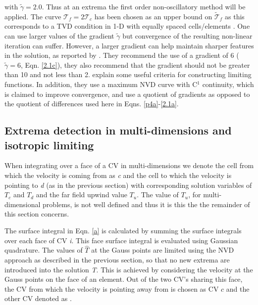 with $\widetilde{\gamma} = 2.0$. Thus at an extrema the first order non-oscillatory method will be applied.  The curve $\mathcal{T}_{f} = 2\mathcal{T}_{c}$ has been chosen as an upper bound on $\widetilde{\mathcal{T}}_{f}$ as this corresponds to a TVD condition in 1-D  with equally spaced cells/elements \citep[see][]{hirsch_1990}.  One can use larger values of the gradient $\widetilde{\gamma}$ but convergence of the resulting non-linear iteration can suffer.  However, a larger gradient can help maintain sharper features in the solution, as reported by \citet{jasak_1999}.  They recommend the use of a gradient of 6 ($\widetilde{\gamma} = 6$, Eqn. \ref{2.1c}), they also recommend that the gradient should not be greater than 10 and not less than 2.  \citet{piperno_1998} explain some useful criteria for constructing limiting functions.  In addition, they use a maximum NVD curve with C$^{1}$ continuity, which is claimed to improve convergence, and use a quotient of gradients as opposed to the quotient of differences used here in Eqns. \ref{p4a}-\ref{2.1a}. 


\subsection{Extrema detection in multi-dimensions and isotropic limiting}

When integrating over a face of a CV in multi-dimensions we denote the cell from which the velocity is coming from as \textit{c} and the cell to which the velocity is pointing to \textit{d} (as in the previous section) with corresponding solution variables of $T_{c}$ and $T_{d}$ and the far field upwind value $T_{u}$. The value of $T_{u}$, for multi-dimensional  problems, is not well defined and thus it is this the the remainder of this section concerns.

The surface integral in Eqn. \ref{a} is calculated by summing the surface integrals over each face of CV \textit{i}. This face surface integral is evaluated using Gaussian quadrature. The values of $\widehat{T}$ at the Gauss points are limited using the NVD approach as described in the previous section, so that no new extrema are introduced into the solution \textit{T}. This is achieved by considering the velocity at the Gauss points on the face of an element. Out of the two CV's sharing this face, the CV from which the velocity is pointing away from is chosen as CV $c$ and the other CV denoted as .


